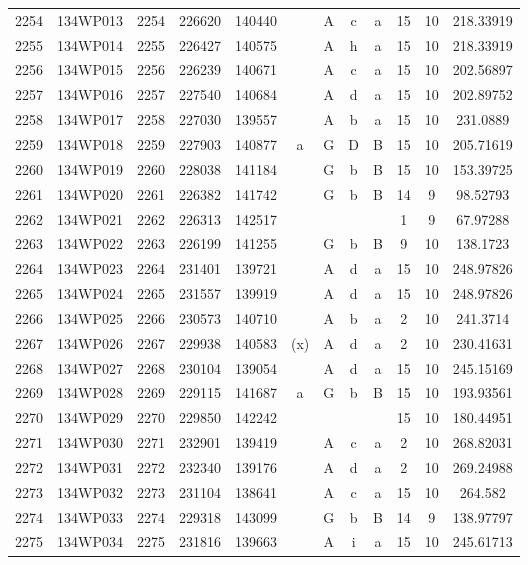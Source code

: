 \begin{tabular}{|*{12}{c|}}
2254 & 134WP013 & 2254 & 226620 & 140440 &  & A & c & a & 15 & 10 & 218.33919 \\ 
2255 & 134WP014 & 2255 & 226427 & 140575 &  & A & h & a & 15 & 10 & 218.33919 \\ 
2256 & 134WP015 & 2256 & 226239 & 140671 &  & A & c & a & 15 & 10 & 202.56897 \\ 
2257 & 134WP016 & 2257 & 227540 & 140684 &  & A & d & a & 15 & 10 & 202.89752 \\ 
2258 & 134WP017 & 2258 & 227030 & 139557 &  & A & b & a & 15 & 10 & 231.0889 \\ 
2259 & 134WP018 & 2259 & 227903 & 140877 & a & G & D & B & 15 & 10 & 205.71619 \\ 
2260 & 134WP019 & 2260 & 228038 & 141184 &  & G & b & B & 15 & 10 & 153.39725 \\ 
2261 & 134WP020 & 2261 & 226382 & 141742 &  & G & b & B & 14 & 9 & 98.52793 \\ 
2262 & 134WP021 & 2262 & 226313 & 142517 &  &  &  &  & 1 & 9 & 67.97288 \\ 
2263 & 134WP022 & 2263 & 226199 & 141255 &  & G & b & B & 9 & 10 & 138.1723 \\ 
2264 & 134WP023 & 2264 & 231401 & 139721 &  & A & d & a & 15 & 10 & 248.97826 \\ 
2265 & 134WP024 & 2265 & 231557 & 139919 &  & A & d & a & 15 & 10 & 248.97826 \\ 
2266 & 134WP025 & 2266 & 230573 & 140710 &  & A & b & a & 2 & 10 & 241.3714 \\ 
2267 & 134WP026 & 2267 & 229938 & 140583 & (x) & A & d & a & 2 & 10 & 230.41631 \\ 
2268 & 134WP027 & 2268 & 230104 & 139054 &  & A & d & a & 15 & 10 & 245.15169 \\ 
2269 & 134WP028 & 2269 & 229115 & 141687 & a & G & b & B & 15 & 10 & 193.93561 \\ 
2270 & 134WP029 & 2270 & 229850 & 142242 &  &  &  &  & 15 & 10 & 180.44951 \\ 
2271 & 134WP030 & 2271 & 232901 & 139419 &  & A & c & a & 2 & 10 & 268.82031 \\ 
2272 & 134WP031 & 2272 & 232340 & 139176 &  & A & d & a & 2 & 10 & 269.24988 \\ 
2273 & 134WP032 & 2273 & 231104 & 138641 &  & A & c & a & 15 & 10 & 264.582 \\ 
2274 & 134WP033 & 2274 & 229318 & 143099 &  & G & b & B & 14 & 9 & 138.97797 \\ 
2275 & 134WP034 & 2275 & 231816 & 139663 &  & A & i & a & 15 & 10 & 245.61713 \\ 

\end{tabular}

